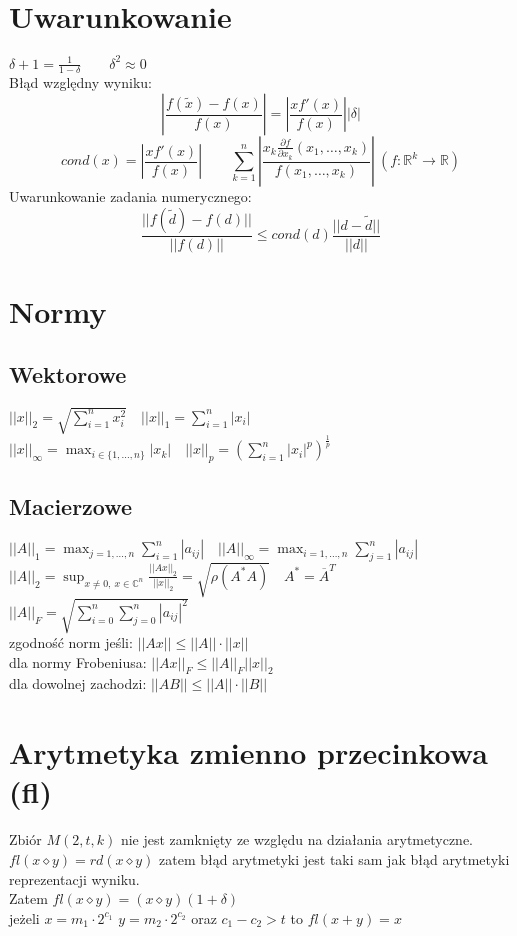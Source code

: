 \documentclass[twocolumn]{article}
\author{Bartosz Chrostowski}
\begin{document}
\begin{flushleft}
\thispagestyle{empty} %
\section{Uwarunkowanie}
$\delta+1 = \frac{1}{1-\delta} \qquad \delta^{2} \approx 0$\\
Błąd względny wyniku: $$\left| \frac{f(\widetilde{x}) - f(x)}{f(x)} \right| = \left| \frac{xf'(x)}{f(x)} \right| |\delta|$$
$$cond(x) = \left| \frac{xf'(x)}{f(x)} \right| \qquad \sum_{k=1}^{n} \left| \frac{x_k \frac{\partial f}{\partial x_k}(x_1,\ldots,x_k)}{f(x_1,\ldots,x_k)} \right| \ (f:\mathbb{R}^k \rightarrow \mathbb{R})$$
Uwarunkowanie zadania numerycznego: $$\frac{||f(\widetilde{d}) - f(d)||}{||f(d)||} \leq cond(d) \frac{||d - \widetilde{d}||}{||d||}$$

\section{Normy}
\subsection{Wektorowe}
$ ||x||_{2} = \sqrt{\sum_{i=1}^{n} x_{i}^{2}} \quad ||x||_{1} = \sum_{i=1}^{n} |x_{i}| $\\
$ ||x||_{\infty} = \max_{i \in \{1,\ldots,n\}} |x_{k}| \quad ||x||_{p} = \left(\sum_{i=1}^{n}|x_{i}|^{p}\right)^{\frac{1}{p}} $\\
\subsection{Macierzowe}
$ ||A||_{1} = \max_{j=1,\ldots,n} \sum_{i=1}^{n}|a_{ij}| \quad ||A||_{\infty} = \max_{i=1,\ldots,n} \sum_{j=1}^{n}|a_{ij}| $\\
$ ||A||_{2} = \sup_{x \neq 0, \ x \in \mathbb{C}^{n}} \frac{||Ax||_{2}}{||x||_{2}} = \sqrt{\rho\left(A^{*}A\right)} \quad A^{*} = \overline{A}^{T}$\\
$ ||A||_{F} = \sqrt{\sum_{i = 0}^{n} \sum_{j = 0}^{n} |a_{ij}|^{2}} $\\
zgodność norm jeśli: $||Ax|| \leq ||A|| \cdot ||x||$\\
dla normy Frobeniusa: $||Ax||_{F} \leq ||A||_{F} ||x||_{2}$\\
dla dowolnej zachodzi: $||AB|| \leq ||A|| \cdot ||B||$

\section{Arytmetyka zmienno przecinkowa (fl)}
Zbiór $M( 2,t,k )$ nie jest zamknięty ze względu na działania arytmetyczne. 
$fl(x \diamond y) = rd(x \diamond y)$ zatem błąd arytmetyki jest taki sam jak błąd arytmetyki reprezentacji wyniku.\\
Zatem $fl(x \diamond y) = (x \diamond y)(1 + \delta) $\\ jeżeli $x = m_{1}\cdot2^{c_{1}}$ $y = m_{2}\cdot2^{c_{2}}$ oraz $c_{1} -c_{2} > t$ to $fl(x+y) = x$


\end{flushleft}
\end{document}

